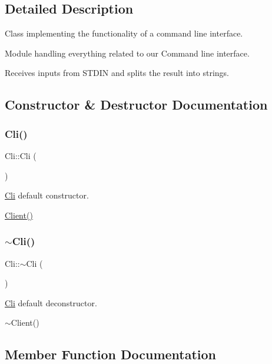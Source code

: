 \subsection{Detailed Description}
Class implementing the functionality of a command line interface. 

Module handling everything related to our Command line interface.

Receives inputs from S\+T\+D\+IN and splits the result into strings. 

\subsection{Constructor \& Destructor Documentation}
\mbox{\label{classCli_a8f7e5909bf64db25f1f264d206d61140}} 
\subsubsection{\texorpdfstring{Cli()}{Cli()}}
{\footnotesize\ttfamily Cli\+::\+Cli (\begin{DoxyParamCaption}{ }\end{DoxyParamCaption})\hspace{0.3cm}{\ttfamily [default]}}



\hyperlink{classCli}{Cli} default constructor. 

\hyperlink{classClient}{Client()} \mbox{\label{classCli_a516ed9664c99d6275d7675194f5564bf}} 
\subsubsection{\texorpdfstring{$\sim$\+Cli()}{~Cli()}}
{\footnotesize\ttfamily Cli\+::$\sim$\+Cli (\begin{DoxyParamCaption}{ }\end{DoxyParamCaption})\hspace{0.3cm}{\ttfamily [default]}}



\hyperlink{classCli}{Cli} default deconstructor. 

$\sim$\+Client() 

\subsection{Member Function Documentation}
\mbox{\label{classCli_a8c364ee0c6abe9589a4e0c8758d17f88}} 
